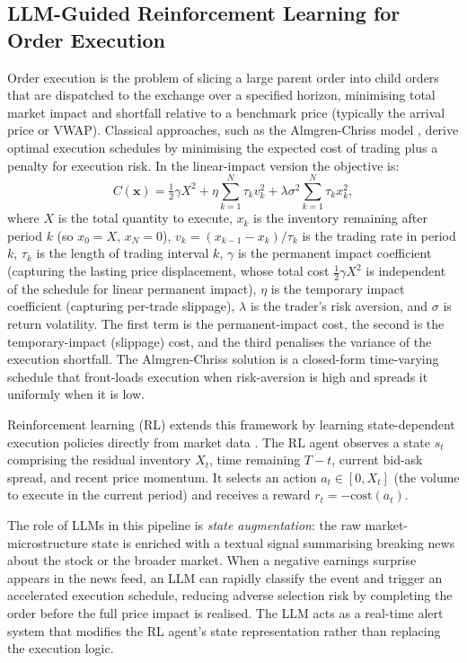 \subsection{LLM-Guided Reinforcement Learning for Order Execution}
\label{sec:ch10-rl-order-execution}

Order execution is the problem of slicing a large parent order into child orders that are
dispatched to the exchange over a specified horizon, minimising total market impact and
shortfall relative to a benchmark price (typically the arrival price or VWAP). Classical
approaches, such as the Almgren-Chriss model \citep{almgren2001optimal}, derive optimal
execution schedules by minimising the expected cost of trading plus a penalty for
execution risk. In the linear-impact version the objective is:
\begin{equation}
  C(\mathbf{x}) = \tfrac{1}{2}\gamma X^2
                + \eta  \sum_{k=1}^{N} \tau_k v_k^2
                + \lambda \sigma^2 \sum_{k=1}^{N} \tau_k x_k^2,
  \label{eq:ch10-ac-cost}
\end{equation}
where $X$ is the total quantity to execute, $x_k$ is the inventory remaining after
period $k$ (so $x_0 = X$, $x_N = 0$), $v_k = (x_{k-1}-x_k)/\tau_k$ is the trading rate in
period $k$, $\tau_k$ is the length of trading interval $k$, $\gamma$ is the permanent
impact coefficient (capturing the lasting price displacement, whose total cost
$\tfrac{1}{2}\gamma X^2$ is independent of the schedule for linear permanent impact),
$\eta$ is the temporary impact coefficient (capturing per-trade slippage), $\lambda$
is the trader's risk aversion, and $\sigma$ is return volatility.  The first term is
the permanent-impact cost, the second is the temporary-impact (slippage) cost, and the
third penalises the variance of the execution shortfall.
The Almgren-Chriss solution is a closed-form time-varying schedule that front-loads
execution when risk-aversion is high and spreads it uniformly when it is low.

Reinforcement learning (RL) extends this framework by learning state-dependent execution
policies directly from market data \citep{mnih2015human, liu2022finrl}. The RL agent
observes a state $s_t$ comprising the residual inventory $X_t$, time remaining $T - t$,
current bid-ask spread, and recent price momentum. It selects an action $a_t \in [0, X_t]$
(the volume to execute in the current period) and receives a reward $r_t = -\text{cost}(a_t)$.

The role of LLMs in this pipeline is \emph{state augmentation}: the raw market-microstructure
state is enriched with a textual signal summarising breaking news about the stock or the
broader market. When a negative earnings surprise appears in the news feed, an LLM can
rapidly classify the event and trigger an accelerated execution schedule, reducing
adverse selection risk by completing the order before the full price impact is realised.
The LLM acts as a real-time alert system that modifies the RL agent's state representation
rather than replacing the execution logic.

